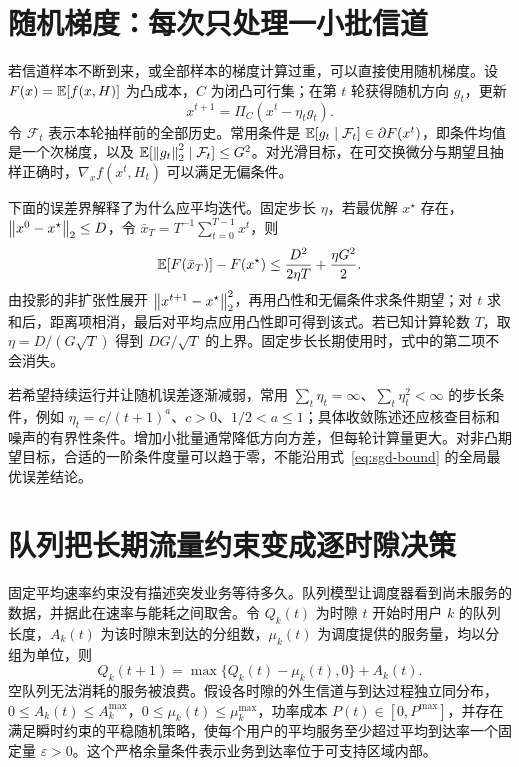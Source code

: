 \section{随机梯度：每次只处理一小批信道}
若信道样本不断到来，或全部样本的梯度计算过重，可以直接使用随机梯度。设 $F(x)=\mathbb E[f(x,H)]$ 为凸成本，$C$ 为闭凸可行集；在第 $t$ 轮获得随机方向 $g_t$，更新
\begin{equation}
 x^{t+1}=\Pi_C(x^t-\eta_t g_t).
 \label{eq:sgd}
\end{equation}
令 $\mathcal F_t$ 表示本轮抽样前的全部历史。常用条件是
$\mathbb E[g_t\mid\mathcal F_t]\in\partial F(x^t)$，即条件均值是一个次梯度，以及
$\mathbb E[\left\lVert g_t\right\rVert_2^2\mid\mathcal F_t]\le G^2$。对光滑目标，在可交换微分与期望且抽样正确时，$\nabla_x f(x^t,H_t)$ 可以满足无偏条件。

下面的误差界解释了为什么应平均迭代。固定步长 $\eta$，若最优解 $x^\star$ 存在，$\left\lVert x^0-x^\star\right\rVert_2\le D$，令 $\bar x_T=T^{-1}\sum_{t=0}^{T-1}x^t$，则
\begin{equation}
 \mathbb E[F(\bar x_T)]-F(x^\star)
 \le\frac{D^2}{2\eta T}+\frac{\eta G^2}{2}.
 \label{eq:sgd-bound}
\end{equation}
由投影的非扩张性展开 $\left\lVert x^{t+1}-x^\star\right\rVert_2^2$，再用凸性和无偏条件求条件期望；对 $t$ 求和后，距离项相消，最后对平均点应用凸性即可得到该式。若已知计算轮数 $T$，取 $\eta=D/(G\sqrt T)$ 得到 $DG/\sqrt T$ 的上界。固定步长长期使用时，式中的第二项不会消失。

若希望持续运行并让随机误差逐渐减弱，常用 $\sum_t\eta_t=\infty$、$\sum_t\eta_t^2<\infty$ 的步长条件，例如 $\eta_t=c/(t+1)^a$、$c>0$、$1/2<a\le1$；具体收敛陈述还应核查目标和噪声的有界性条件。增加小批量通常降低方向方差，但每轮计算量更大。对非凸期望目标，合适的一阶条件度量可以趋于零，不能沿用式~\eqref{eq:sgd-bound} 的全局最优误差结论。

\section{队列把长期流量约束变成逐时隙决策}
固定平均速率约束没有描述突发业务等待多久。队列模型让调度器看到尚未服务的数据，并据此在速率与能耗之间取舍。令 $Q_k(t)$ 为时隙 $t$ 开始时用户 $k$ 的队列长度，$A_k(t)$ 为该时隙末到达的分组数，$\mu_k(t)$ 为调度提供的服务量，均以分组为单位，则
\begin{equation}
 Q_k(t+1)=\max\{Q_k(t)-\mu_k(t),0\}+A_k(t).
 \label{eq:queue-update}
\end{equation}
空队列无法消耗的服务被浪费。假设各时隙的外生信道与到达过程独立同分布，$0\le A_k(t)\le A_k^{\max}$，$0\le\mu_k(t)\le\mu_k^{\max}$，功率成本 $P(t)\in[0,P^{\max}]$，并存在满足瞬时约束的平稳随机策略，使每个用户的平均服务至少超过平均到达率一个固定量 $\varepsilon>0$。这个严格余量条件表示业务到达率位于可支持区域内部。

